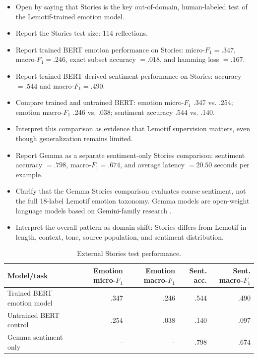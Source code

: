 \begin{itemize}
    \item Open by saying that Stories is the key out-of-domain, human-labeled test of the Lemotif-trained emotion model.
    \item Report the Stories test size: 114 reflections.
    \item Report trained BERT emotion performance on Stories: micro-$F_1 = .347$, macro-$F_1 = .246$, exact subset accuracy $= .018$, and hamming loss $= .167$.
    \item Report trained BERT derived sentiment performance on Stories: accuracy $= .544$ and macro-$F_1 = .490$.
    \item Compare trained and untrained BERT: emotion micro-$F_1$ .347 vs. .254; emotion macro-$F_1$ .246 vs. .038; sentiment accuracy .544 vs. .140.
    \item Interpret this comparison as evidence that Lemotif supervision matters, even though generalization remains limited.
    \item Report Gemma as a separate sentiment-only Stories comparison: sentiment accuracy $= .798$, macro-$F_1 = .674$, and average latency $= 20.50$ seconds per example.
    \item Clarify that the Gemma Stories comparison evaluates coarse sentiment, not the full 18-label Lemotif emotion taxonomy. Gemma models are open-weight language models based on Gemini-family research \parencite{gemmateam2024gemma}.
    \item Interpret the overall pattern as domain shift: Stories differs from Lemotif in length, context, tone, source population, and sentiment distribution.
\end{itemize}

\begin{table}[htbp]
    \centering
    \caption{External Stories test performance.}
    \label{tab:stories-external}
    \begin{tabular}{lrrrr}
        \toprule
        Model/task & Emotion micro-$F_1$ & Emotion macro-$F_1$ & Sent. acc. & Sent. macro-$F_1$ \\
        \midrule
        Trained BERT emotion model & .347 & .246 & .544 & .490 \\
        Untrained BERT control & .254 & .038 & .140 & .097 \\
        Gemma sentiment only & -- & -- & .798 & .674 \\
        \bottomrule
    \end{tabular}
\end{table}

